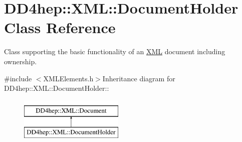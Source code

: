\hypertarget{class_d_d4hep_1_1_x_m_l_1_1_document_holder}{
\section{DD4hep::XML::DocumentHolder Class Reference}
\label{class_d_d4hep_1_1_x_m_l_1_1_document_holder}
}


Class supporting the basic functionality of an \hyperlink{namespace_d_d4hep_1_1_x_m_l}{XML} document including ownership.  


{\ttfamily \#include $<$XMLElements.h$>$}Inheritance diagram for DD4hep::XML::DocumentHolder::\begin{figure}[H]
\begin{center}
\leavevmode
\includegraphics[height=2cm]{class_d_d4hep_1_1_x_m_l_1_1_document_holder}
\end{center}
\end{figure}
